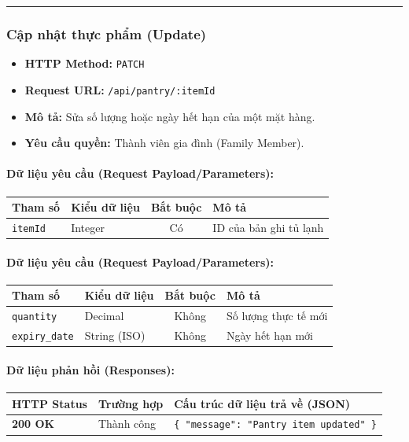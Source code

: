 \documentclass[12pt,a4paper]{article}
\begin{document}
\vskip 0.4cm
\noindent\rule{\textwidth}{0.3pt}
\vskip 0.4cm

\subsubsection{Cập nhật thực phẩm (Update)}
\begin{itemize}[leftmargin=*]
    \item \textbf{HTTP Method:} \texttt{PATCH}
    \item \textbf{Request URL:} \texttt{/api/pantry/:itemId}
    \item \textbf{Mô tả:} Sửa số lượng hoặc ngày hết hạn của một mặt hàng.
    \item \textbf{Yêu cầu quyền:} Thành viên gia đình (Family Member).
\end{itemize}

\paragraph{Dữ liệu yêu cầu (Request Payload/Parameters):}
\begin{longtable}{|p{2.8cm}|p{2.2cm}|c|p{7.0cm}|}
\hline
\textbf{Tham số} & \textbf{Kiểu dữ liệu} & \textbf{Bắt buộc} & \textbf{Mô tả} \\ \hline
\endhead
\texttt{itemId} & Integer & Có & ID của bản ghi tủ lạnh \\ \hline
\end{longtable}

\paragraph{Dữ liệu yêu cầu (Request Payload/Parameters):}
\begin{longtable}{|p{2.8cm}|p{2.2cm}|c|p{7.0cm}|}
\hline
\textbf{Tham số} & \textbf{Kiểu dữ liệu} & \textbf{Bắt buộc} & \textbf{Mô tả} \\ \hline
\endhead
\texttt{quantity} & Decimal & Không & Số lượng thực tế mới \\ \hline
\texttt{expiry\_date} & String (ISO) & Không & Ngày hết hạn mới \\ \hline
\end{longtable}

\paragraph{Dữ liệu phản hồi (Responses):}
\begin{longtable}{|p{2.8cm}|p{3.2cm}|p{8.0cm}|}
\hline
\textbf{HTTP Status} & \textbf{Trường hợp} & \textbf{Cấu trúc dữ liệu trả về (JSON)} \\ \hline
\endhead
\textbf{200 OK} & Thành công & \texttt{\{ "message": "Pantry item updated" \}} \\ \hline
\end{longtable}
\end{document}
